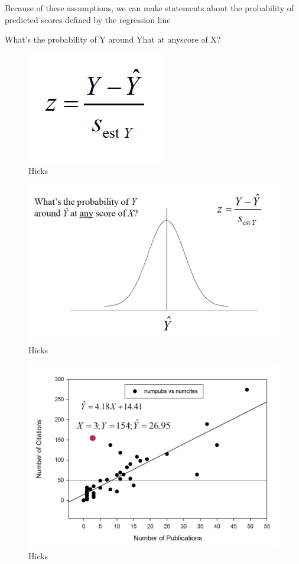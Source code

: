 \documentclass[]{book}
\theoremstyle{definition}
\theoremstyle{definition}
\theoremstyle{definition}
\theoremstyle{remark}
\begin{document}
{Because of these assumptions, we can make statements about the
probability of predicted scores defined by the regression line

What's the probability of Y around Yhat at anyscore of X?

\begin{figure}
\centering
\includegraphics{img/hicksreg13.png}
\caption{Hicks}
\end{figure}

\begin{figure}
\centering
\includegraphics{img/hicksreg14.png}
\caption{Hicks}
\end{figure}

\begin{figure}
\centering
\includegraphics{img/hicksreg15.png}
\caption{Hicks}
\end{figure}

}
\end{document}
